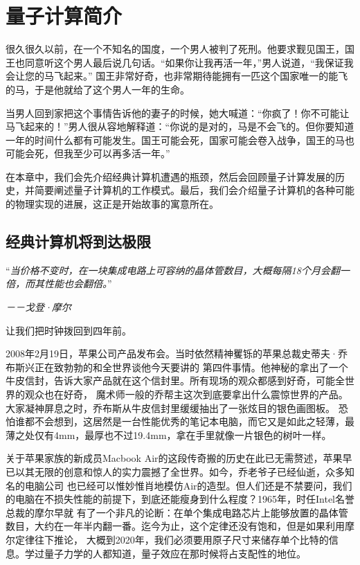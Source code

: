 ﻿
\chapter{量子计算简介}
很久很久以前，在一个不知名的国度，一个男人被判了死刑。他要求觐见国王，国王也同意听这个男人最后说几句话。“如果你让我再活一年，”男人说道，“我保证我会让您的马飞起来。”
国王非常好奇，也非常期待能拥有一匹这个国家唯一的能飞的马，于是他就给了这个男人一年的生命。

当男人回到家把这个事情告诉他的妻子的时候，她大喊道：“你疯了！你不可能让马飞起来的！”男人很从容地解释道：“你说的是对的，马是不会飞的。但你要知道一年的时间什么都有可能发生。国王可能会死，国家可能会卷入战争，国王的马也可能会死，但我至少可以再多活一年。”

在本章中，我们会先介绍经典计算机遭遇的瓶颈，然后会回顾量子计算发展的历史，并简要阐述量子计算机的工作模式。最后，我们会介绍量子计算机的各种可能的物理实现的进展，这正是开始故事的寓意所在。
\label{chap:introduction}
    \section{经典计算机将到达极限}
    “\emph{当价格不变时，在一块集成电路上可容纳的晶体管数目，大概每隔18个月会翻一倍，而其性能也会翻倍。}”

 \hspace{23em} \emph{－－戈登·摩尔}


让我们把时钟拨回到四年前。

2008年2月19日，苹果公司产品发布会。当时依然精神矍铄的苹果总裁史蒂夫·乔布斯兴正在致勃勃的和全世界谈他今天要讲的
第四件事情。他神秘的拿出了一个牛皮信封，告诉大家产品就在这个信封里。所有现场的观众都感到好奇，可能全世界的观众也在好奇，
魔术师一般的乔帮主这次到底要拿出什么震惊世界的产品。大家凝神屏息之时，乔布斯从牛皮信封里缓缓抽出了一张炫目的银色画图板。
恐怕谁都不会想到，这居然是一台性能优秀的笔记本电脑，而它又是如此之轻薄，最薄之处仅有4mm，最厚也不过19.4mm，拿在手里就像一片银色的树叶一样。

关于苹果家族的新成员Macbook Air的这段传奇搬的历史在此已无需赘述，苹果早已以其无限的创意和惊人的实力震撼了全世界。如今，乔老爷子已经仙逝，众多知名的电脑公司
也已经可以惟妙惟肖地模仿Air的造型。但人们还是不禁要问，我们的电脑在不损失性能的前提下，到底还能瘦身到什么程度？1965年，时任Intel名誉总裁的摩尔早就
有了一个非凡的论断：在单个集成电路芯片上能够放置的晶体管数目，大约在一年半内翻一番。迄今为止，这个定律还没有饱和，但是如果利用摩尔定律往下推论，
大概到2020年，我们必须要用原子尺寸来储存单个比特的信息。学过量子力学的人都知道，量子效应在那时候将占支配性的地位。

